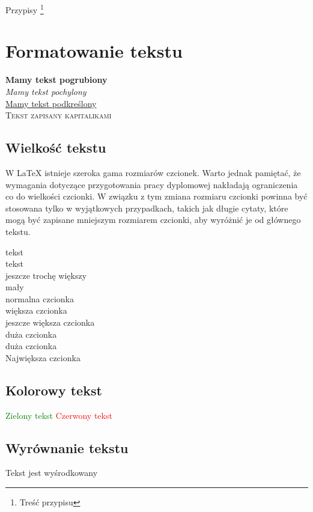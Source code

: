 \documentclass[12pt,a4paper,twoside]{report}
\theoremstyle{definition} %
\begin{document}
	Przypisy \footnote{Treść przypisu}
	
	
	\section{Formatowanie tekstu}
	
	\textbf{Mamy tekst pogrubiony} \\
	\textit{Mamy tekst pochylony} \\
	\underline{Mamy tekst podkreślony}\\
	\textsc{Tekst zapisany kapitalikami}
	
	
	\subsection{Wielkość tekstu}

W LaTeX istnieje szeroka gama rozmiarów czcionek. Warto jednak pamiętać, że wymagania dotyczące przygotowania pracy dyplomowej nakładają ograniczenia co do wielkości czcionki. W związku z tym zmiana rozmiaru czcionki powinna być stosowana tylko w wyjątkowych przypadkach, takich jak długie cytaty, które mogą być zapisane mniejszym rozmiarem czcionki, aby wyróżnić je od głównego tekstu.
	
	\tiny{tekst}\\
	\scriptsize{tekst}\\
	\footnotesize{jeszcze trochę większy}\\
	\small{mały}\\
	\normalsize{normalna czcionka}\\
	\large{większa czcionka}\\
	\Large{jeszcze większa czcionka}\\
	\LARGE{ duża czcionka}\\ 
	\huge{duża czcionka}\\
	\Huge{Największa czcionka}
	
	
	
	\subsection{Kolorowy tekst}
	\normalsize{
		\textcolor{green}{Zielony tekst}}
	\textcolor{red}{Czerwony tekst}
	
	
	\subsection{Wyrównanie tekstu}
	\begin{center}
		Tekst jest wyśrodkowany
	\end{center}
	
\end{document}
